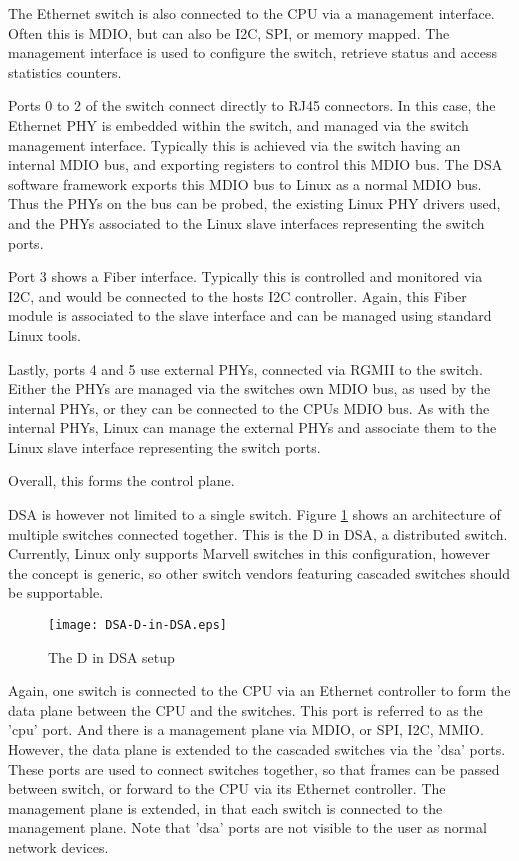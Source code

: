 \documentclass[letterpaper]{article}
\begin{document}
The Ethernet switch is also connected to the CPU via a management
interface. Often this is MDIO, but can also be I2C, SPI, or memory
mapped. The management interface is used to configure the switch,
retrieve status and access statistics counters.

Ports 0 to 2 of the switch connect directly to RJ45 connectors. In
this case, the Ethernet PHY is embedded within the switch, and managed
via the switch management interface. Typically this is achieved via
the switch having an internal MDIO bus, and exporting registers to
control this MDIO bus. The DSA software framework exports this MDIO
bus to Linux as a normal MDIO bus. Thus the PHYs on the bus can be
probed, the existing Linux PHY drivers used, and the PHYs associated
to the Linux slave interfaces representing the switch ports.

Port 3 shows a Fiber interface. Typically this is controlled and
monitored via I2C, and would be connected to the hosts I2C
controller. Again, this Fiber module is associated to the slave
interface and can be managed using standard Linux tools.

Lastly, ports 4 and 5 use external PHYs, connected via RGMII to the
switch. Either the PHYs are managed via the switches own MDIO bus, as
used by the internal PHYs, or they can be connected to the CPUs MDIO
bus. As with the internal PHYs, Linux can manage the external PHYs and
associate them to the Linux slave interface representing the switch
ports.

Overall, this forms the control plane.

DSA is however not limited to a single switch. Figure \ref{d-in-dsa}
shows an architecture of multiple switches connected together. This is
the D in DSA, a distributed switch. Currently, Linux only supports
Marvell switches in this configuration, however the concept is
generic, so other switch vendors featuring cascaded switches should be
supportable.

\begin{figure}[ht]
  \centering
  \texttt{[image: DSA-D-in-DSA.eps]}
  \caption{The D in DSA setup}
  \label{d-in-dsa}
\end{figure}

Again, one switch is connected to the CPU via an Ethernet controller
to form the data plane between the CPU and the switches. This port is
referred to as the 'cpu' port. And there is a management plane via
MDIO, or SPI, I2C, MMIO. However, the data plane is extended to the
cascaded switches via the 'dsa' ports. These ports are used to connect
switches together, so that frames can be passed between switch, or
forward to the CPU via its Ethernet controller. The management plane
is extended, in that each switch is connected to the management plane.
Note that 'dsa' ports are not visible to the user as normal network
devices.
\end{document}
